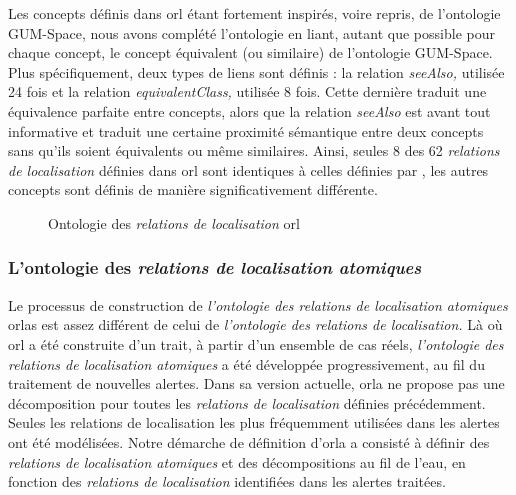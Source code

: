 Les concepts définis dans \ac{orl} étant fortement inspirés, voire
repris, de l'ontologie GUM-Space, nous avons complété l'ontologie en
liant, autant que possible pour chaque concept, le concept équivalent
(ou similaire) de l'ontologie GUM-Space. Plus spécifiquement, deux
types de liens sont définis : la relation \emph{seeAlso,} utilisée 24
fois et la relation \emph{equivalentClass,} utilisée 8 fois. Cette
dernière traduit une équivalence parfaite entre concepts, alors que la
relation \emph{seeAlso} est avant tout informative et traduit une
certaine proximité sémantique entre deux concepts sans qu'ils soient
équivalents ou même similaires. Ainsi, seules 8 des 62 \emph{relations
  de localisation} définies dans \ac{orl} sont identiques à celles
définies par \textcite{Bateman2010}, les autres concepts sont définis
de manière significativement différente.

\begin{figure}
  \centering
  
  \caption{Ontologie des \emph{relations de localisation} \ac{orl}}
  \label{fig:ontho}
\end{figure}

\subsubsection{L'ontologie des \emph{relations de localisation
    atomiques}}

Le processus de construction de \emph{l'ontologie des relations de
  localisation atomiques} \acp{orla} est assez différent de celui de
\emph{l'ontologie des relations de localisation.} Là où \ac{orl} a été
construite d'un trait, à partir d'un ensemble de cas réels,
\emph{l'ontologie des relations de localisation atomiques} a été
développée progressivement, au fil du traitement de nouvelles
alertes. Dans sa version actuelle, \ac{orla} ne propose pas une
décomposition pour toutes les \emph{relations de localisation}
définies précédemment. Seules les relations de localisation les plus
fréquemment utilisées dans les alertes ont été modélisées. Notre
démarche de définition d'\ac{orla} a consisté à définir des
\emph{relations de localisation atomiques} et des décompositions au
fil de l'eau, en fonction des \emph{relations de localisation}
identifiées dans les alertes traitées.

